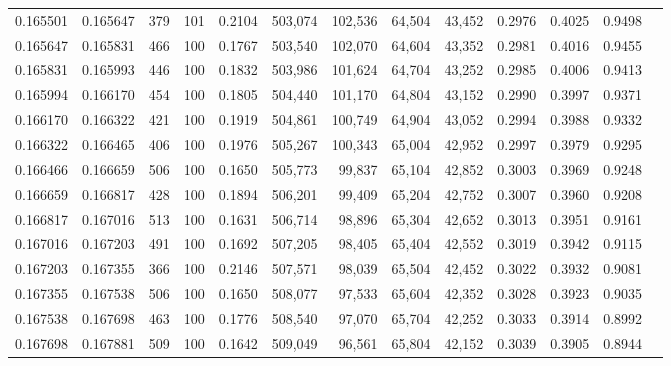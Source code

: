 \begin{tabular}{rrrrrrrrrrrrr}
0.165501 & 0.165647 &   379 & 101 &                                     0.2104 & 503,074 & 102,536 &  64,504 &  43,452 & 0.2976 & 0.4025 & 0.9498 \\
0.165647 & 0.165831 &   466 & 100 &                                     0.1767 & 503,540 & 102,070 &  64,604 &  43,352 & 0.2981 & 0.4016 & 0.9455 \\
0.165831 & 0.165993 &   446 & 100 &                                     0.1832 & 503,986 & 101,624 &  64,704 &  43,252 & 0.2985 & 0.4006 & 0.9413 \\
0.165994 & 0.166170 &   454 & 100 &                                     0.1805 & 504,440 & 101,170 &  64,804 &  43,152 & 0.2990 & 0.3997 & 0.9371 \\
0.166170 & 0.166322 &   421 & 100 &                                     0.1919 & 504,861 & 100,749 &  64,904 &  43,052 & 0.2994 & 0.3988 & 0.9332 \\
0.166322 & 0.166465 &   406 & 100 &                                     0.1976 & 505,267 & 100,343 &  65,004 &  42,952 & 0.2997 & 0.3979 & 0.9295 \\
0.166466 & 0.166659 &   506 & 100 &                                     0.1650 & 505,773 &  99,837 &  65,104 &  42,852 & 0.3003 & 0.3969 & 0.9248 \\
0.166659 & 0.166817 &   428 & 100 &                                     0.1894 & 506,201 &  99,409 &  65,204 &  42,752 & 0.3007 & 0.3960 & 0.9208 \\
0.166817 & 0.167016 &   513 & 100 &                                     0.1631 & 506,714 &  98,896 &  65,304 &  42,652 & 0.3013 & 0.3951 & 0.9161 \\
0.167016 & 0.167203 &   491 & 100 &                                     0.1692 & 507,205 &  98,405 &  65,404 &  42,552 & 0.3019 & 0.3942 & 0.9115 \\
0.167203 & 0.167355 &   366 & 100 &                                     0.2146 & 507,571 &  98,039 &  65,504 &  42,452 & 0.3022 & 0.3932 & 0.9081 \\
0.167355 & 0.167538 &   506 & 100 &                                     0.1650 & 508,077 &  97,533 &  65,604 &  42,352 & 0.3028 & 0.3923 & 0.9035 \\
0.167538 & 0.167698 &   463 & 100 &                                     0.1776 & 508,540 &  97,070 &  65,704 &  42,252 & 0.3033 & 0.3914 & 0.8992 \\
0.167698 & 0.167881 &   509 & 100 &                                     0.1642 & 509,049 &  96,561 &  65,804 &  42,152 & 0.3039 & 0.3905 & 0.8944 \\

\end{tabular}
